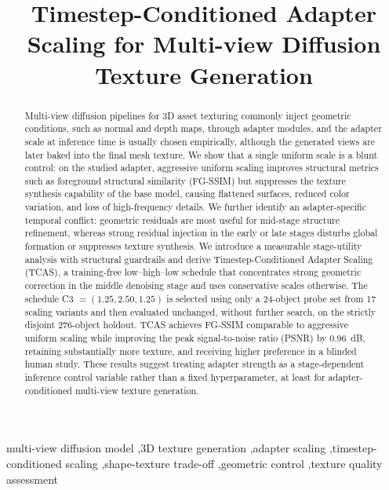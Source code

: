 \documentclass[times,twocolumn,final]{elsarticle}
\begin{document}
\begin{frontmatter}

\title{Timestep-Conditioned Adapter Scaling for Multi-view Diffusion Texture Generation}


\begin{abstract}
Multi-view diffusion pipelines for 3D asset texturing commonly inject geometric conditions, such as normal and depth maps, through adapter modules, and the adapter scale at inference time is usually chosen empirically, although the generated views are later baked into the final mesh texture. We show that a single uniform scale is a blunt control: on the studied adapter, aggressive uniform scaling improves structural metrics such as foreground structural similarity (FG-SSIM) but suppresses the texture synthesis capability of the base model, causing flattened surfaces, reduced color variation, and loss of high-frequency details. We further identify an adapter-specific temporal conflict: geometric residuals are most useful for mid-stage structure refinement, whereas strong residual injection in the early or late stages disturbs global formation or suppresses texture synthesis. We introduce a measurable stage-utility analysis with structural guardrails and derive Timestep-Conditioned Adapter Scaling (TCAS), a training-free low--high--low schedule that concentrates strong geometric correction in the middle denoising stage and uses conservative scales otherwise. The schedule C3 $=(1.25, 2.50, 1.25)$ is selected using only a 24-object probe set from 17 scaling variants and then evaluated unchanged, without further search, on the strictly disjoint 276-object holdout. TCAS achieves FG-SSIM comparable to aggressive uniform scaling while improving the peak signal-to-noise ratio (PSNR) by 0.96~dB, retaining substantially more texture, and receiving higher preference in a blinded human study. These results suggest treating adapter strength as a stage-dependent inference control variable rather than a fixed hyperparameter, at least for adapter-conditioned multi-view texture generation.
\end{abstract}

\begin{keyword}
\KWD
multi-view diffusion model \sep 3D texture generation \sep adapter scaling \sep timestep-conditioned scaling \sep shape-texture trade-off \sep geometric control \sep texture quality assessment
\end{keyword}

\end{frontmatter}
\end{document}
